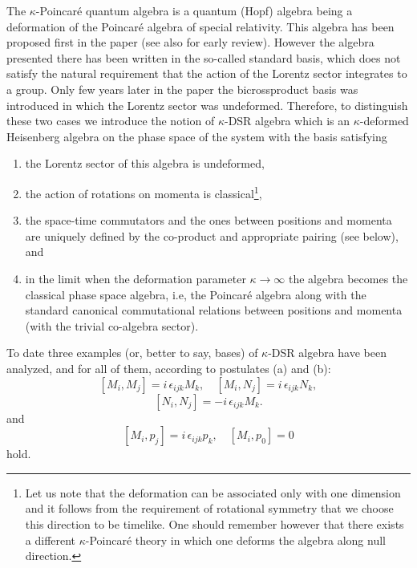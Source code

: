 \documentclass [prd,twocolumn,nofootinbib,showpacs]  {revtex4}
\begin{document}
The $\kappa$-Poincar\'e quantum algebra is a quantum (Hopf)
algebra being  a deformation of the Poincar\'e algebra of special
relativity. This algebra has been proposed first in the paper
\cite{lunoruto} (see also \cite{rurev} for early review). However
the algebra presented there has been written in the so-called
standard basis, which does not satisfy the natural requirement
that the action of the Lorentz sector integrates to a group. Only
few years later in the paper \cite{maru} the bicrossproduct basis
was introduced in which the Lorentz sector was undeformed.
Therefore, to distinguish these two cases we  introduce the notion
of $\kappa$-DSR algebra  which is an $\kappa$-deformed Heisenberg
algebra  on the phase space of the system with the basis
satisfying
\begin{enumerate}
\item the Lorentz sector of this algebra is undeformed,
\item the action of rotations  on momenta is classical\footnote{Let
us note that the deformation can be associated only with one
dimension and it follows from the requirement of rotational
symmetry that we choose this direction to be timelike. One should
remember however that there exists a different $\kappa$-Poincar\'e
theory in which one deforms the algebra along null direction.},
\item the space-time commutators and the ones between positions and
momenta are uniquely defined by the co-product and appropriate
pairing (see below), and \item in the limit when the deformation
parameter $\kappa \rightarrow\infty$ the algebra becomes the
classical phase space algebra, i.e, the Poincar\'e algebra along
with the standard canonical commutational relations between
positions and momenta (with the trivial co-algebra sector).
\end{enumerate}

To date three examples (or, better to say, bases) of $\kappa$-DSR
algebra have been analyzed, and for all of them, according to
postulates (a) and (b):
$$
[M_i, M_j] = i\, \epsilon_{ijk} M_k, \quad [M_i, N_j] = i\, \epsilon_{ijk} N_k,
$$
\begin{equation}\label{1}
  [N_i, N_j] = -i\, \epsilon_{ijk} M_k.
\end{equation}
and
\begin{equation}\label{2}
  [M_i, p_j] = i\, \epsilon_{ijk} p_k, \quad [M_i, p_0] =0
\end{equation}
hold.
\newline
\end{document}
